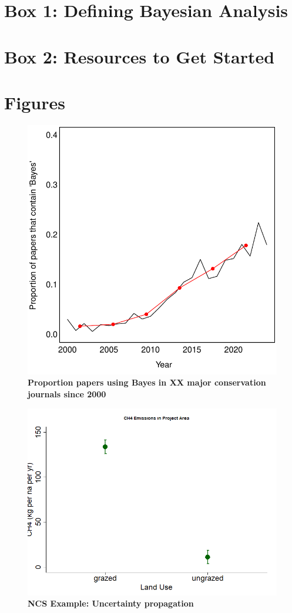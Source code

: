 \documentclass{article}
\begin{document}
\par 
\section* {Box 1: Defining Bayesian Analysis}

\section* {Box 2: Resources to Get Started}



\section* {Figures}

\begin{figure}[h]
\centering
 \includegraphics{../figs/conservation.pdf}
 \caption{\textbf{Proportion papers using Bayes in XX major conservation journals since 2000}} 
 \label{fig:consbaystrend}
 \end{figure}
 
 \begin{figure}[h]
\centering
 \includegraphics{../figs/ncs/ncsprojimpactch4.png}
 \caption{\textbf{NCS Example: Uncertainty propagation}} 
 \label{fig:ncs}
 \end{figure}
\end{document}
